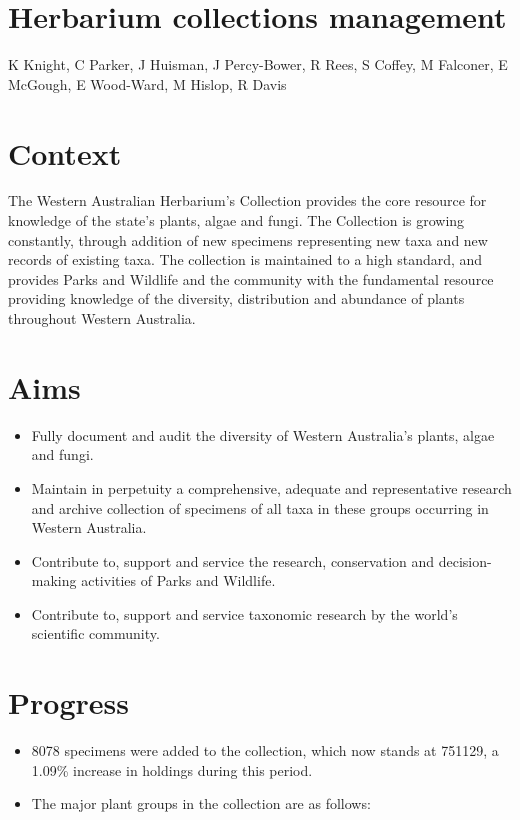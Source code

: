 \documentclass[version=last,
    paper=a4, %
    10pt, %
    usenames,
    dvipsnames,
    oneside, %
    headings=openany, %
    DIV=15 %
]{scrbook}
\begin{document}
\section*{Herbarium collections management
}

K Knight, C Parker, J Huisman, J Percy-Bower, R Rees, S Coffey, M
Falconer, E McGough, E Wood-Ward, M Hislop, R Davis



\section*{Context}

The Western Australian Herbarium's Collection provides the core resource
for knowledge of the state's plants, algae and fungi. The Collection is
growing constantly, through addition of new specimens representing new
taxa and new records of existing taxa. The collection is maintained to a
high standard, and provides Parks and Wildlife and the community with
the fundamental resource providing knowledge of the diversity,
distribution and abundance of plants throughout Western Australia.




\section*{Aims}

\begin{itemize}
\itemsep1pt\parskip0pt
\item
  Fully document and audit the diversity of Western Australia's plants,
  algae and fungi.
\item
  Maintain in perpetuity a comprehensive, adequate and representative
  research and archive collection of specimens of all taxa in these
  groups occurring in Western Australia.
\item
  Contribute to, support and service the research, conservation and
  decision-making activities of Parks and Wildlife.
\item
  Contribute to, support and service taxonomic research by the world's
  scientific community.
\end{itemize}




\section*{Progress}

\begin{itemize}
\itemsep1pt\parskip0pt
\item
  8078 specimens were added to the collection, which now stands at
  751129, a 1.09\% increase in holdings during this period.
\item
  The major plant groups in the collection are as follows:
\end{itemize}
\end{document}
